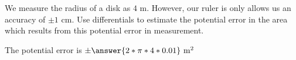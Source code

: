 \documentclass{ximera}
\author{Steven Gubkin}
\begin{document}
\begin{exercise}
  We measure the radius of a disk as $4 \textrm{ m}$.  However, our
  ruler is only allows us an accuracy of $\pm 1 \textrm{ cm}$.  Use
  differentials to estimate the potential error in the area which
  results from this potential error in measurement.

\begin{prompt}
  The potential error is $\pm \answer{2*\pi*4*0.01} \textrm{ m}^2$
\end{prompt}

\end{exercise}
\end{document}
